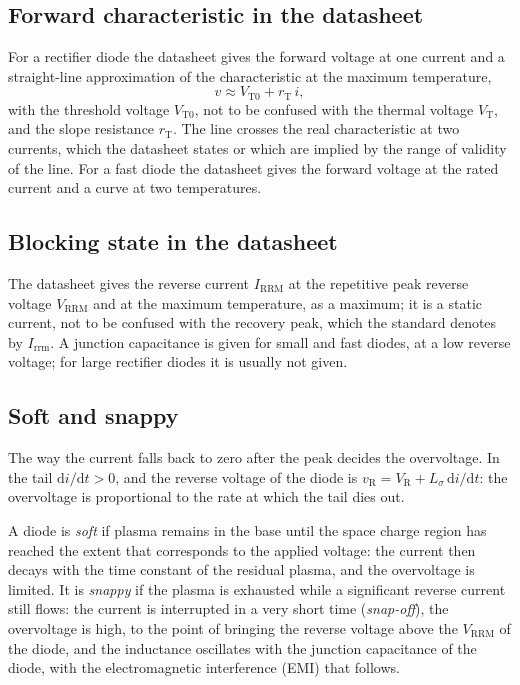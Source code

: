 \documentclass[10pt,a4paper]{scrartcl}
\newcommand{\VR}{V_\mathrm{R}}
\newcommand{\VT}{V_\mathrm{T}}
\newcommand{\VTo}{V_\mathrm{T0}}
\newcommand{\rT}{r_\mathrm{T}}
\newcommand{\Vrrm}{V_\mathrm{RRM}}
\newcommand{\Irrm}{I_\mathrm{RRM}}
\newcommand{\diff}{\mathrm{d}}
\newcommand{\Ls}{L_\sigma}                    %
\begin{document}
\subsection{Forward characteristic in the datasheet}
For a rectifier diode the datasheet gives the forward voltage at one current and a straight-line approximation of the characteristic at the maximum temperature,
\begin{equation}
v \approx \VTo + \rT\, i ,
\label{eq:line}
\end{equation}
with the threshold voltage $\VTo$, not to be confused with the thermal voltage $\VT$, and the slope resistance $\rT$. The line crosses the real characteristic at two currents, which the datasheet states or which are implied by the range of validity of the line. For a fast diode the datasheet gives the forward voltage at the rated current and a curve at two temperatures.

\subsection{Blocking state in the datasheet}
The datasheet gives the reverse current $\Irrm$ at the repetitive peak reverse voltage $\Vrrm$ and at the maximum temperature, as a maximum; it is a static current, not to be confused with the recovery peak, which the standard denotes by $I_\mathrm{rrm}$. A junction capacitance is given for small and fast diodes, at a low reverse voltage; for large rectifier diodes it is usually not given.
\subsection{Soft and snappy}
\label{sec:softsnappy}
The way the current falls back to zero after the peak decides the overvoltage. In the tail $\diff i/\diff t > 0$, and the reverse voltage of the diode is $v_\mathrm{R} = \VR + \Ls\,\diff i/\diff t$: the overvoltage is proportional to the rate at which the tail dies out.

A diode is \emph{soft} if plasma remains in the base until the space charge region has reached the extent that corresponds to the applied voltage: the current then decays with the time constant of the residual plasma, and the overvoltage is limited. It is \emph{snappy} if the plasma is exhausted while a significant reverse current still flows: the current is interrupted in a very short time (\emph{snap-off}), the overvoltage is high, to the point of bringing the reverse voltage above the $\Vrrm$ of the diode, and the inductance oscillates with the junction capacitance of the diode, with the electromagnetic interference (EMI) that follows.
\end{document}
